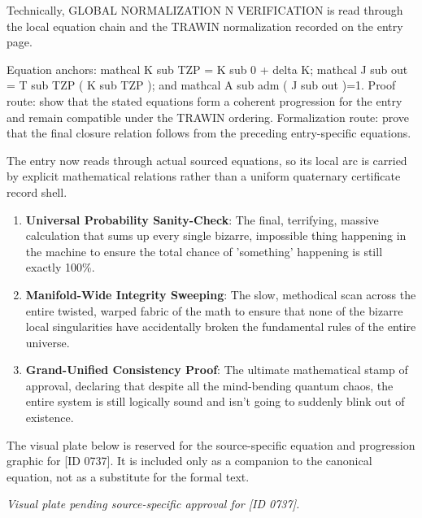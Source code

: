 Technically, GLOBAL NORMALIZATION N VERIFICATION is read through the local equation chain and the TRAWIN normalization recorded on the entry page.

Equation anchors: mathcal K sub TZP = K sub 0 + delta K; mathcal J sub out = T sub TZP ( K sub TZP ); and mathcal A sub adm ( J sub out )=1. Proof route: show that the stated equations form a coherent progression for the entry and remain compatible under the TRAWIN ordering. Formalization route: prove that the final closure relation follows from the preceding entry-specific equations.

The entry now reads through actual sourced equations, so its local arc is carried by explicit mathematical relations rather than a uniform quaternary certificate record shell.
\endgroup

\begin{enumerate}[leftmargin=1.6em,itemsep=6pt,topsep=4pt]
\item \textbf{Universal Probability Sanity-Check}: The final, terrifying, massive calculation that sums up every single bizarre, impossible thing happening in the machine to ensure the total chance of 'something' happening is still exactly 100\%.
\item \textbf{Manifold-Wide Integrity Sweeping}: The slow, methodical scan across the entire twisted, warped fabric of the math to ensure that none of the bizarre local singularities have accidentally broken the fundamental rules of the entire universe.
\item \textbf{Grand-Unified Consistency Proof}: The ultimate mathematical stamp of approval, declaring that despite all the mind-bending quantum chaos, the entire system is still logically sound and isn't going to suddenly blink out of existence.
\end{enumerate}

\begingroup\footnotesize\sloppy
The visual plate below is reserved for the source-specific equation and progression graphic for [ID 0737]. It is included only as a companion to the canonical equation, not as a substitute for the formal text.
\par\endgroup
\begingroup\footnotesize\itshape
Visual plate pending source-specific approval for [ID 0737].
\par\endgroup

